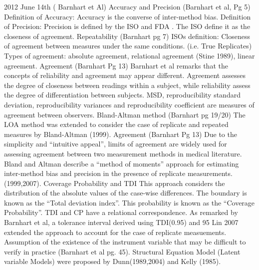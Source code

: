 2012 June 14th ( Barnhart et Al)
Accuracy and Precision (Barnhart et al, Pg 5)
Definition of Accuracy: Accuracy is the converse of inter-method bias.
Definition of Precision: Precision is defined by the ISO and FDA . The ISO define it as the closeness of agreement.
Repeatability (Barnhart pg 7)
ISOs definition: Closeness of agreement between measures under the same conditions. (i.e. True Replicates)
Types of agreement:  absolute agreement, relational agreement (Stine 1989), linear agreement.
Agreement (Barnhart Pg 13)
Barnhart et al remarks that the concepts of reliability and agreement may appear different.
Agreement assesses the degree of closeness between readings within a subject, while reliability assess the degree of differentiation between subjects.
MSD, reproducibility standard deviation, reproducibility variances and reproducibility coefficient are measures of agreement between observers.
Bland-Altman method (Barnhart pg 19/20)
The LOA method was extended to consider the case of replicate and repeated measures by Bland-Altman (1999).
Agreement (Barnhart Pg 13)
Due to the simplicity and “intuitive appeal”, limits of agreement are widely used for assessing agreement between two measurement methods in medical literature.
Bland and Altman describe a “method of moments” approach for estimating inter-method bias and precision in the presence of replicate measurements. (1999,2007).
Coverage Probability and TDI
This approach considers the distribution of the absolute values of the case-wise differences.
The boundary is known as the “Total deviation index”.
This probability is known as the “Coverage Probability”. TDI and CP have a relational correspondence.
As remarked by Barnhart et al, a tolerance interval derived using TDI(0.95) and 95%
Lin 2007 extended the approach to account for the case of replicate measuements.
Assumption of the existence of the instrument variable that may be difficult to verify in practice (Barnhart et al pg. 45).
Structural Equation Model (Latent variable Models) were proposed by Dunn(1989,2004) and Kelly (1985).

